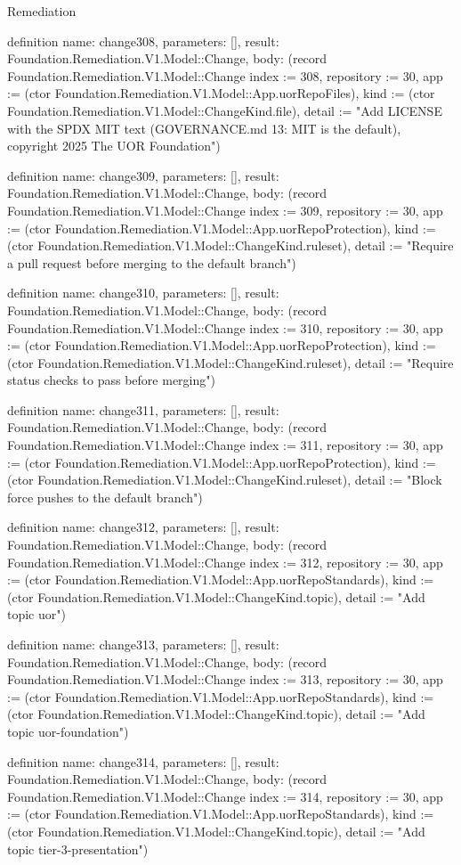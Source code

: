 \begin{lexlean}{Remediation}
\begin{semanticmodule}
definition{
  name: change308,
  parameters: [],
  result: Foundation.Remediation.V1.Model::Change,
  body: (record Foundation.Remediation.V1.Model::Change {index := 308, repository := 30, app := (ctor Foundation.Remediation.V1.Model::App.uorRepoFiles), kind := (ctor Foundation.Remediation.V1.Model::ChangeKind.file), detail := "Add LICENSE with the SPDX MIT text (GOVERNANCE.md 13: MIT is the default), copyright 2025 The UOR Foundation"})
}

definition{
  name: change309,
  parameters: [],
  result: Foundation.Remediation.V1.Model::Change,
  body: (record Foundation.Remediation.V1.Model::Change {index := 309, repository := 30, app := (ctor Foundation.Remediation.V1.Model::App.uorRepoProtection), kind := (ctor Foundation.Remediation.V1.Model::ChangeKind.ruleset), detail := "Require a pull request before merging to the default branch"})
}

definition{
  name: change310,
  parameters: [],
  result: Foundation.Remediation.V1.Model::Change,
  body: (record Foundation.Remediation.V1.Model::Change {index := 310, repository := 30, app := (ctor Foundation.Remediation.V1.Model::App.uorRepoProtection), kind := (ctor Foundation.Remediation.V1.Model::ChangeKind.ruleset), detail := "Require status checks to pass before merging"})
}

definition{
  name: change311,
  parameters: [],
  result: Foundation.Remediation.V1.Model::Change,
  body: (record Foundation.Remediation.V1.Model::Change {index := 311, repository := 30, app := (ctor Foundation.Remediation.V1.Model::App.uorRepoProtection), kind := (ctor Foundation.Remediation.V1.Model::ChangeKind.ruleset), detail := "Block force pushes to the default branch"})
}

definition{
  name: change312,
  parameters: [],
  result: Foundation.Remediation.V1.Model::Change,
  body: (record Foundation.Remediation.V1.Model::Change {index := 312, repository := 30, app := (ctor Foundation.Remediation.V1.Model::App.uorRepoStandards), kind := (ctor Foundation.Remediation.V1.Model::ChangeKind.topic), detail := "Add topic uor"})
}

definition{
  name: change313,
  parameters: [],
  result: Foundation.Remediation.V1.Model::Change,
  body: (record Foundation.Remediation.V1.Model::Change {index := 313, repository := 30, app := (ctor Foundation.Remediation.V1.Model::App.uorRepoStandards), kind := (ctor Foundation.Remediation.V1.Model::ChangeKind.topic), detail := "Add topic uor-foundation"})
}

definition{
  name: change314,
  parameters: [],
  result: Foundation.Remediation.V1.Model::Change,
  body: (record Foundation.Remediation.V1.Model::Change {index := 314, repository := 30, app := (ctor Foundation.Remediation.V1.Model::App.uorRepoStandards), kind := (ctor Foundation.Remediation.V1.Model::ChangeKind.topic), detail := "Add topic tier-3-presentation"})
}


\end{semanticmodule}
\end{lexlean}
